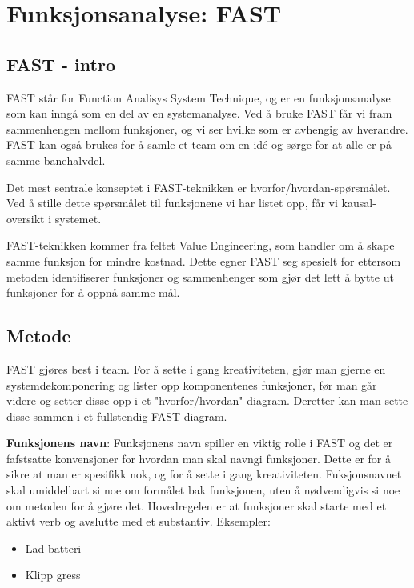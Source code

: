 \section{Funksjonsanalyse: FAST}
\label{sec:fast}

\subsection{FAST - intro}

FAST står for Function Analisys System Technique, og er en funksjonsanalyse som kan inngå som en del av en systemanalyse. Ved å bruke FAST får vi fram sammenhengen mellom funksjoner, og vi ser hvilke som er avhengig av hverandre. FAST kan også brukes for å samle et team om en idé og sørge for at alle er på samme banehalvdel.


Det mest sentrale konseptet i FAST-teknikken er hvorfor/hvordan-spørsmålet. Ved å stille dette spørsmålet til funksjonene vi har listet opp, får vi kausal-oversikt i systemet.

FAST-teknikken kommer fra feltet Value Engineering, som handler om å skape samme funksjon for mindre kostnad. Dette egner FAST seg spesielt for ettersom metoden identifiserer funksjoner og sammenhenger som gjør det lett å bytte ut funksjoner for å oppnå samme mål.


\subsection{Metode}

FAST gjøres best i team. For å sette i gang kreativiteten, gjør man gjerne en systemdekomponering og lister opp komponentenes funksjoner, før man går videre og setter disse opp i et "hvorfor/hvordan"-diagram. Deretter kan man sette disse sammen i et fullstendig FAST-diagram.

\textbf{Funksjonens navn}: Funksjonens navn spiller en viktig rolle i FAST og det er fafstsatte konvensjoner for hvordan man skal navngi funksjoner. Dette er for å sikre at man er spesifikk nok, og for å sette i gang kreativiteten.
Fuksjonsnavnet skal umiddelbart si noe om formålet bak funksjonen, uten å nødvendigvis si noe om metoden for å gjøre det. Hovedregelen er at funksjoner skal starte med et aktivt verb og avslutte med et substantiv. Eksempler:

\begin{itemize}
    \item Lad batteri
    \item Klipp gress
\end{itemize}

